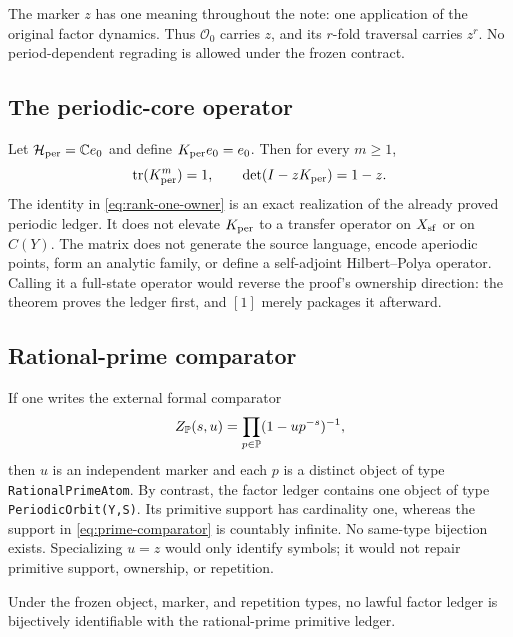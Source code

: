 The marker \(z\) has one meaning throughout the note: one application of the
original factor dynamics.  Thus \(\mathcal O_0\) carries \(z\), and its
\(r\)-fold traversal carries \(z^r\).  No period-dependent regrading is
allowed under the frozen contract.

\subsection{The periodic-core operator}

Let \(\mathcal H_{\rm per}=\mathbb C e_0\) and define
\(K_{\mathrm{per}} e_0=e_0\).  Then for every \(m\geq1\),
\begin{equation}
  \operatorname{tr}(K_{\mathrm{per}}^m)=1,
  \qquad
  \det(I-zK_{\mathrm{per}})=1-z.
  \label{eq:rank-one-owner}
\end{equation}
The identity in \cref{eq:rank-one-owner} is an exact realization of the already
proved periodic ledger.  It does not elevate \(K_{\mathrm{per}}\) to a transfer
operator on \(X_{\mathrm{sf}}\) or on \(C(Y)\).  The matrix does not generate the source
language, encode aperiodic points, form an analytic family, or define a
self-adjoint Hilbert--Polya operator.  Calling it a full-state operator would
reverse the proof's ownership direction: the theorem proves the ledger
first, and \([1]\) merely packages it afterward.

\subsection{Rational-prime comparator}

If one writes the external formal comparator
\begin{equation}
  Z_{\mathbb P}(s,u)=
  \prod_{p\in\mathbb P}(1-u p^{-s})^{-1},
  \label{eq:prime-comparator}
\end{equation}
then \(u\) is an independent marker and each \(p\) is a distinct object of
type \texttt{RationalPrimeAtom}.  By contrast, the factor ledger contains one
object of type \texttt{PeriodicOrbit(Y,S)}.  Its primitive support has
cardinality one, whereas the support in \cref{eq:prime-comparator} is
countably infinite.  No same-type bijection exists.  Specializing \(u=z\)
would only identify symbols; it would not repair primitive support,
ownership, or repetition.

\begin{proposition}
\label{prop:primitive-obstruction}
Under the frozen object, marker, and repetition types, no lawful factor
ledger is bijectively identifiable with the rational-prime primitive ledger.
\end{proposition}

